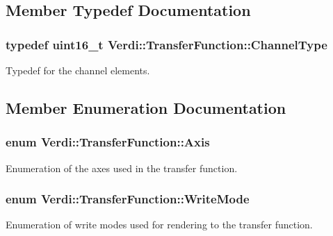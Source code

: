 \subsection{\-Member \-Typedef \-Documentation}
\hypertarget{class_verdi_1_1_transfer_function_aebdbb5a13f273ee6d47d1a4dde6d6aa6}{
\subsubsection[{\-Channel\-Type}]{\setlength{\rightskip}{0pt plus 5cm}typedef uint16\-\_\-t {\bf \-Verdi\-::\-Transfer\-Function\-::\-Channel\-Type}}}\label{class_verdi_1_1_transfer_function_aebdbb5a13f273ee6d47d1a4dde6d6aa6}
\-Typedef for the channel elements. 

\subsection{\-Member \-Enumeration \-Documentation}
\hypertarget{class_verdi_1_1_transfer_function_a1b35c3ddc3f16d44146168cdad8cdd6a}{
\subsubsection[{\-Axis}]{\setlength{\rightskip}{0pt plus 5cm}enum {\bf \-Verdi\-::\-Transfer\-Function\-::\-Axis}}}\label{class_verdi_1_1_transfer_function_a1b35c3ddc3f16d44146168cdad8cdd6a}
\-Enumeration of the axes used in the transfer function. \hypertarget{class_verdi_1_1_transfer_function_ab597e576b24962e48164808518c06714}{
\subsubsection[{\-Write\-Mode}]{\setlength{\rightskip}{0pt plus 5cm}enum {\bf \-Verdi\-::\-Transfer\-Function\-::\-Write\-Mode}}}\label{class_verdi_1_1_transfer_function_ab597e576b24962e48164808518c06714}
\-Enumeration of write modes used for rendering to the transfer function. 


